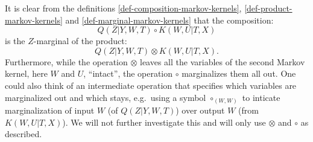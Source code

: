 \begin{Rem}\label{rem:markov-kernel-product-and-composition}
It is clear from the definitions \ref{def-composition-markov-kernels}, \ref{def-product-markov-kernels} and \ref{def-marginal-markov-kernels} that the composition:
    \[Q(Z|Y,W,T) \circ K(W,U|T,X)\]
    is the $Z$-marginal of the product:
    \[ Q(Z|Y,W,T) \otimes K(W,U|T,X).\]
Furthermore, while the operation $\otimes$ leaves all the variables of the second Markov kernel, here $W$ and $U$, ``intact'',
the operation $\circ$ marginalizes them all out. One could also think of an intermediate operation that specifies which variables
are marginalized out and which stays, e.g.\ using a symbol $\circ_{(W,W)}$ to inticate marginalization of input $W$ (of $Q(Z|Y,W,T)$) over output $W$ (from $K(W,U|T,X)$). We will not further investigate this and will only use $\otimes$ and $\circ$ as described.
\end{Rem}

